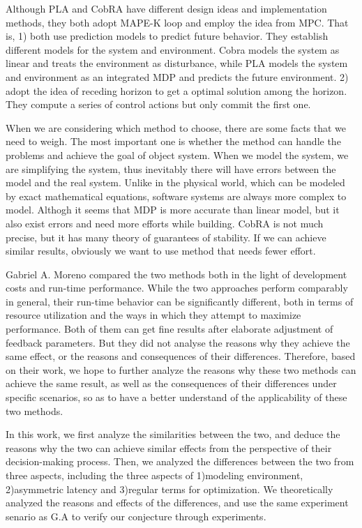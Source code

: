 \documentclass[sigconf]{acmart}
\begin{document}
Although PLA and CobRA have different design ideas and implementation methods, they both adopt MAPE-K loop\cite{mape-k} and employ the idea from MPC. That is, 
1) both use prediction models to predict future behavior. They establish different models for the system and environment.
Cobra models the system as linear and treats the environment as disturbance, while PLA models the system and environment as an integrated MDP and predicts the future environment.
2) adopt the idea of receding horizon to get a optimal solution among the horizon. They compute a series of control actions but only commit the first one.

When we are considering which method to choose, there are some facts that we need to weigh. The most important one is whether the method can handle the problems and achieve the goal of object system. When we model the system, we are simplifying the system, thus inevitably there will have errors between the model and the real system. Unlike in the physical world, which can be modeled by exact mathematical equations, software systems are always more complex to model. Althogh it seems that MDP is more accurate than linear model, but it also exist errors and need more efforts while building. CobRA is not much precise, but it has many theory of guarantees of stability. If we can achieve similar results, obviously we want to use method that needs fewer effort.

Gabriel A. Moreno compared the two methods both in the light of development costs and run-time performance. While the two approaches perform comparably in general, their run-time behavior can be significantly different, both in terms of resource utilization and the ways in which they attempt to maximize performance. Both of them can get fine results after elaborate adjustment of feedback parameters. But they did not analyse the reasons why they achieve the same effect, or the reasons and consequences of their differences.
Therefore, based on their work, we hope to further analyze the reasons why these two methods can achieve the same result, as well as the consequences of their differences under specific scenarios, so as to have a better understand of the applicability of these two methods.

In this work, we first analyze the similarities between the two, and deduce the reasons why the two can achieve similar effects from the perspective of their decision-making process. Then, we analyzed the differences between the two from three aspects, including the three aspects of 1)modeling environment, 2)asymmetric latency and 3)regular terms for optimization. We theoretically analyzed the reasons and effects of the differences, and use the same experiment senario as G.A\cite{GA} to verify our conjecture through experiments.
\end{document}
